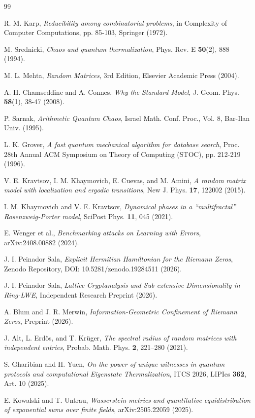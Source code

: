 \documentclass[sn-mathphys]{sn-jnl}
\theoremstyle{definition} %
\begin{document}
\begin{thebibliography}{99}

R. M. Karp, \textit{Reducibility among combinatorial problems}, in Complexity of Computer Computations, pp. 85-103, Springer (1972).

M. Srednicki, \textit{Chaos and quantum thermalization}, Phys. Rev. E \textbf{50}(2), 888 (1994).

M. L. Mehta, \textit{Random Matrices}, 3rd Edition, Elsevier Academic Press (2004).

A. H. Chamseddine and A. Connes, \textit{Why the Standard Model}, J. Geom. Phys. \textbf{58}(1), 38-47 (2008).

P. Sarnak, \textit{Arithmetic Quantum Chaos}, Israel Math. Conf. Proc., Vol. 8, Bar-Ilan Univ. (1995).

L. K. Grover, \textit{A fast quantum mechanical algorithm for database search}, Proc. 28th Annual ACM Symposium on Theory of Computing (STOC), pp. 212-219 (1996).

V. E. Kravtsov, I. M. Khaymovich, E. Cuevas, and M. Amini, \textit{A random matrix model with localization and ergodic transitions}, New J. Phys. \textbf{17}, 122002 (2015).

I. M. Khaymovich and V. E. Kravtsov, \textit{Dynamical phases in a ``multifractal'' Rosenzweig-Porter model}, SciPost Phys. \textbf{11}, 045 (2021).

E. Wenger et al., \textit{Benchmarking attacks on Learning with Errors}, arXiv:2408.00882 (2024).

J. I. Peinador Sala, \textit{Explicit Hermitian Hamiltonian for the Riemann Zeros}, Zenodo Repository, DOI: 10.5281/zenodo.19284511 (2026). 

J. I. Peinador Sala, \textit{Lattice Cryptanalysis and Sub-extensive Dimensionality in Ring-LWE}, Independent Research Preprint (2026).

A. Blum and J. R. Merwin, \textit{Information-Geometric Confinement of Riemann Zeros}, Preprint (2026).

J. Alt, L. Erdős, and T. Krüger, \textit{The spectral radius of random matrices with independent entries}, Probab. Math. Phys. \textbf{2}, 221--280 (2021).

S. Gharibian and H. Yuen, \textit{On the power of unique witnesses in quantum protocols and computational Eigenstate Thermalization}, ITCS 2026, LIPIcs \textbf{362}, Art. 10 (2025).

E. Kowalski and T. Untrau, \textit{Wasserstein metrics and quantitative equidistribution of exponential sums over finite fields}, arXiv:2505.22059 (2025).

\end{thebibliography}
\end{document}
